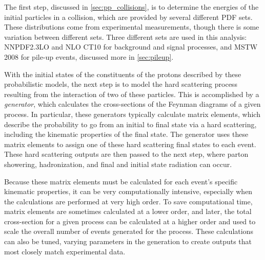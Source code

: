 The first step, discussed in \autoref{sec:pp_collisions}, is to determine the energies of the initial particles in a collision, which are provided by several different \ac{PDF} sets. These distributions come from experimental measurements, though there is some variation between different sets. Three different sets are used in this analysis: NNPDF2.3LO \cite{Ball:2012cx} and NLO CT10 \cite{Lai:2010vv} for background and signal processes, and MSTW 2008 \cite{0901.0002} for pile-up events, discussed more in \autoref{sec:pileup}. 

With the initial states of the constituents of the protons described by these probabilistic models, the next step is to model the hard scattering process resulting from the interaction of two of these particles. This is accomplished by a \textit{generator}, which calculates the cross-sections of the Feynman diagrams of a given process. In particular, these generators typically calculate matrix elements, which describe the probability to go from an initial to final state via a hard scattering, including the kinematic properties of the final state. The generator uses these matrix elements to assign one of these hard scattering final states to each event. These hard scattering outputs are then passed to the next step, where parton showering, hadronization, and final and initial state radiation can occur.

Because these matrix elements must be calculated for each event's specific kinematic properties, it can be very computationally intensive, especially when the calculations are performed at very high order. To save computational time, matrix elements are sometimes calculated at a lower order, and later, the total cross-section for a given process can be calculated at a higher order and used to scale the overall number of events generated for the process. These calculations can also be tuned, varying parameters in the generation to create outputs that most closely match experimental data. 
  

